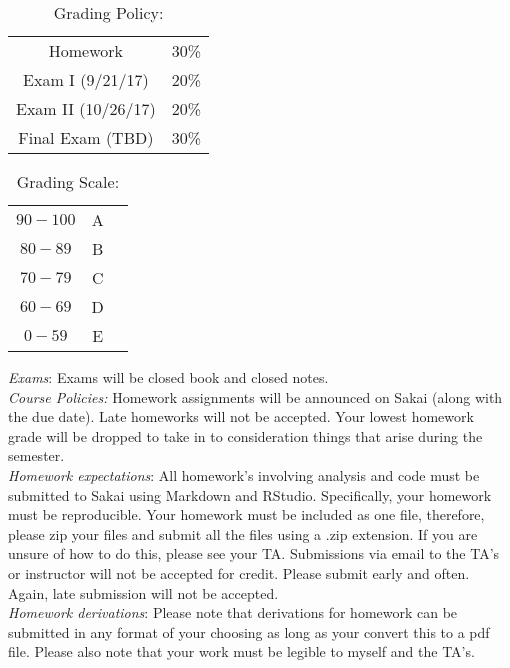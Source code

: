 \documentclass[11pt]{article}
\begin{document}
\begin{table}[ht]
\caption{Grading Policy:}
\begin{center}
\begin{tabular}{cc}
Homework &30\%\\
Exam I (9/21/17) &20\%\\
Exam  II (10/26/17) & 20\%\\
Final Exam  (TBD) & 30\%\\
\end{tabular}
\end{center}
\label{default}
\end{table}%


\begin{table}[ht]
\caption{Grading Scale:}
\begin{center}
\begin{tabular}{ccc}
$90-100$ &A\\
$80-89$ & B\\
$70-79$ & C\\
$60-69$ & D\\
$0-59$ &  E\\
\end{tabular}
\end{center}
\label{default}
\end{table}%

\emph{Exams}: Exams will be closed book and closed notes.\\






\emph{Course Policies:} 
Homework assignments will be announced on Sakai (along with the due date). Late homeworks will not be accepted. Your lowest homework grade will be dropped to take in to consideration things that arise during the semester. \\

\emph{Homework expectations}: All homework's involving analysis and code must be submitted to Sakai using Markdown and RStudio. Specifically, your homework must be reproducible. Your homework must be included as one file, therefore, please zip your files and submit all the files using a .zip extension. If you are unsure of how to do this, please see your TA. Submissions via email to the TA's or instructor will not be accepted for credit. Please submit early and often. Again, late submission will not be accepted. \\

\emph{Homework derivations}: Please note that derivations for homework can be submitted in any format of your choosing as long as your convert this to a pdf file. Please also note that your work must be legible to myself and the TA's. \\
\end{document}
